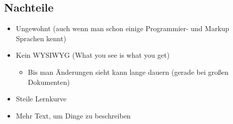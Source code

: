 \documentclass[
    ngerman,
    accentcolor=3b,
    dark_mode,
    fontsize= 12pt,
    a4paper,
    aspectratio=169,
    colorback=true,
    fancy_row_colors,
    leqno,
    fleqn,
    boxarc=3pt,
    fleqn,
    design=2008,
]{algoslides}
\begin{document}
    \subsection{Nachteile}\label{2.2}\label{2.2}
    \begin{frame}
        \slidehead{}
        \begin{itemize}
            \item Ungewohnt (auch wenn man schon einige Programmier- und Markup Sprachen kennt)
            \item Kein WYSIWYG (What you see is what you get)
                \begin{itemize}
                    \item Bis man Änderungen sieht kann lange dauern (gerade bei großen Dokumenten)
                \end{itemize}
            \item Steile Lernkurve
            \item Mehr Text, um Dinge zu beschreiben
        \end{itemize}
    \end{frame}
\end{document}
